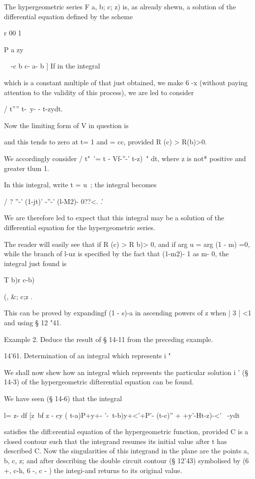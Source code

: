 The hypergeometric series F a, b; c; z) is, as already shewn, a
solution of the differential equation defined by the scheme

r 00 1 \

P a zy

\ \ -c b c- a- b ] If in the integral

which is a constant multiple of that just obtained, we make 6 -x
(without paying attention to the validity of this process), we are led
to consider

/ t'''' t-\ y- - t-zydt.

Now the limiting form of V in question is

and this tends to zero at t= 1 and = cc, provided R (c) > R(b)>0.

We accordingly consider / t"~'= t - Vf-''-' t-z)~" dt, where z is not*
positive and greater tlum 1.

In this integral, write t = u~; the integral becomes

/ ? ''-' (1-jt)' -''-' (l-M2)- 0??<. .'

We are therefore led to expect that this integral may be a solution of
the differential equation for the hypergeometric series.

The reader will easily see that if R (c) > R b)> 0, and if arg u = arg
(1 - m) =0, while the branch of l-uz is specified by the fact that
(1-m2)- 1 as m- 0, the integral just found is

T b)r c-b)

  (, \&; c;z .

This can be proved by expandingf (1 - s)-a in ascending powers of z
when | 3 | <1 and using § 12 "41.

Example 2. Deduce the result of § 14-11 from the preceding example.

14'61. Determination of an integral which represents i "\

We shall now shew how an integral which represents the particular
solution i ' (§ 14-3) of the hypergeometric difterential equation can
be found.

We have seen (§ 14-6) that the integral

l= z- df [z~bf z - cy ( t-a)P+y+- '-\ t-b)y+<'+P'- (t-c)'' +
+y'-Ht-z)-<'~ -ydt

satisfies the difl:erential equation of the hypergeometric function,
provided C is a closed contour such that the integrand resumes its
initial value after t has described C. Now the singularities of this
integrand in the plane are the points a, b, c, z; and after describing
the double circuit contour (§ 12'43) symbolised by (6 +, c-h, 6 -, c
- ) the integi-and returns to its original value.

